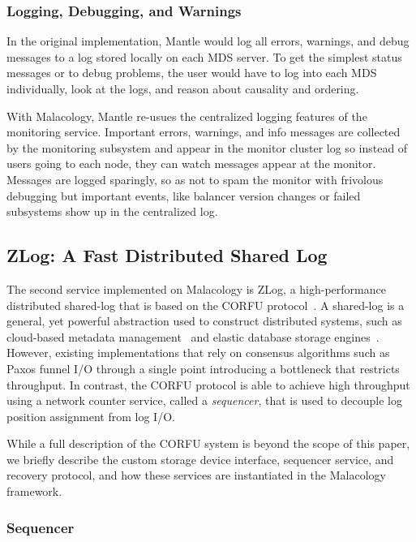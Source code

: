 \documentclass[preprint]{sigplanconf-eurosys}
\begin{document}
\subsubsection{Logging, Debugging, and Warnings}

In the original implementation, Mantle would log all errors, warnings, and
debug messages to a log stored locally on each MDS server. To get the simplest
status messages or to debug problems, the user would have to log into each MDS
individually, look at the logs, and reason about causality and ordering.

With Malacology, Mantle re-usues the centralized logging features of the
monitoring service. Important errors, warnings, and info messages are collected
by the monitoring subsystem and appear in the monitor cluster log so instead of
users going to each node, they can watch messages appear at the monitor.
Messages are logged sparingly, so as not to spam the monitor with frivolous
debugging but important events, like balancer version changes or failed
subsystems show up in the centralized log.

\subsection{ZLog: A Fast Distributed Shared Log}
\label{sec:zlog}

The second service implemented on Malacology is ZLog, a high-performance
distributed shared-log that is based on the CORFU
protocol~\cite{balakrishnan_corfu_2012}. A shared-log is a general, yet
powerful abstraction used to construct distributed systems, such as
cloud-based metadata management~\cite{balakrishnan:sosp13} and elastic database
storage engines~\cite{bernstein:cidr11,bernstein:vldb11,bernstein:sigmod15}.
However, existing implementations that rely on consensus algorithms such as
Paxos funnel I/O through a single point introducing a bottleneck that restricts
throughput.  In contrast, the CORFU protocol is able to achieve high throughput
using a network counter service, called a \emph{sequencer}, that is used to
decouple log position assignment from log I/O.

While a full description of the CORFU system is beyond the scope of this
paper, we briefly describe the custom storage device interface, sequencer
service, and recovery protocol, and how these services are instantiated in the
Malacology framework.

\subsubsection{Sequencer}
\label{sec:seq}
\end{document}
